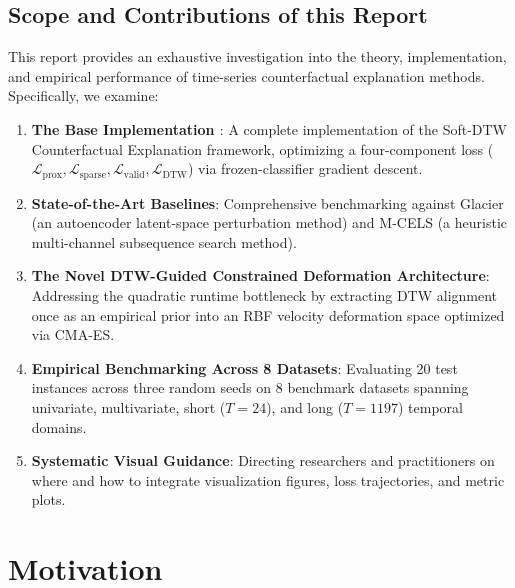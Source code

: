 \documentclass[11pt,a4paper]{report}
\begin{document}
\section{Scope and Contributions of this Report}
This report provides an exhaustive investigation into the theory, implementation, and empirical performance of time-series counterfactual explanation methods. Specifically, we examine:
\begin{enumerate}
    \item \textbf{The Base Implementation \cite{kostrzewa2026towards}}: A complete implementation of the Soft-DTW Counterfactual Explanation framework, optimizing a four-component loss ($\mathcal{L}_{\text{prox}}, \mathcal{L}_{\text{sparse}}, \mathcal{L}_{\text{valid}}, \mathcal{L}_{\text{DTW}}$) via frozen-classifier gradient descent.
    \item \textbf{State-of-the-Art Baselines}: Comprehensive benchmarking against Glacier \cite{delaney2021instance} (an autoencoder latent-space perturbation method) and M-CELS \cite{wang2021large} (a heuristic multi-channel subsequence search method).
    \item \textbf{The Novel DTW-Guided Constrained Deformation Architecture}: Addressing the quadratic runtime bottleneck by extracting DTW alignment once as an empirical prior into an RBF velocity deformation space optimized via CMA-ES.
    \item \textbf{Empirical Benchmarking Across 8 Datasets}: Evaluating 20 test instances across three random seeds on 8 benchmark datasets spanning univariate, multivariate, short ($T=24$), and long ($T=1197$) temporal domains.
    \item \textbf{Systematic Visual Guidance}: Directing researchers and practitioners on where and how to integrate visualization figures, loss trajectories, and metric plots.
\end{enumerate}

\chapter{Motivation}
\end{document}
